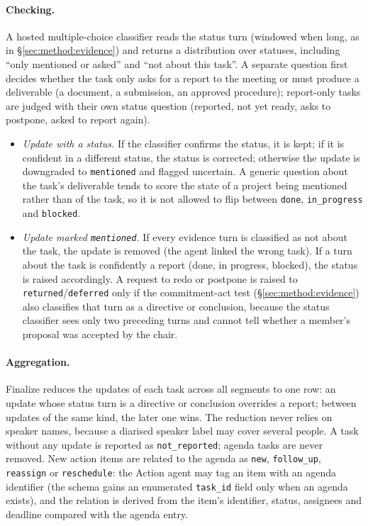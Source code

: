 \paragraph{Checking.}
A hosted multiple-choice classifier reads the status turn (windowed when long, as in \S\ref{sec:method:evidence}) and returns a distribution over statuses, including ``only mentioned or asked'' and ``not about this task''.
A separate question first decides whether the task only asks for a report to the meeting or must produce a deliverable (a document, a submission, an approved procedure); report-only tasks are judged with their own status question (reported, not yet ready, asks to postpone, asked to report again).
\begin{itemize}[nosep,leftmargin=*]
  \item \emph{Update with a status.} If the classifier confirms the status, it is kept; if it is confident in a different status, the status is corrected; otherwise the update is downgraded to \texttt{mentioned} and flagged uncertain.
  A generic question about the task's deliverable tends to score the state of a project being mentioned rather than of the task, so it is not allowed to flip between \texttt{done}, \texttt{in\_progress} and \texttt{blocked}.
  \item \emph{Update marked \texttt{mentioned}.} If every evidence turn is classified as not about the task, the update is removed (the agent linked the wrong task).
  If a turn about the task is confidently a report (done, in progress, blocked), the status is raised accordingly.
  A request to redo or postpone is raised to \texttt{returned}/\texttt{deferred} only if the commitment-act test (\S\ref{sec:method:evidence}) also classifies that turn as a directive or conclusion, because the status classifier sees only two preceding turns and cannot tell whether a member's proposal was accepted by the chair.
\end{itemize}

\paragraph{Aggregation.}
Finalize reduces the updates of each task across all segments to one row: an update whose status turn is a directive or conclusion overrides a report; between updates of the same kind, the later one wins.
The reduction never relies on speaker names, because a diarised speaker label may cover several people.
A task without any update is reported as \texttt{not\_reported}; agenda tasks are never removed.
New action items are related to the agenda as \texttt{new}, \texttt{follow\_up}, \texttt{reassign} or \texttt{reschedule}: the Action agent may tag an item with an agenda identifier (the schema gains an enumerated \texttt{task\_id} field only when an agenda exists), and the relation is derived from the item's identifier, status, assignees and deadline compared with the agenda entry.
